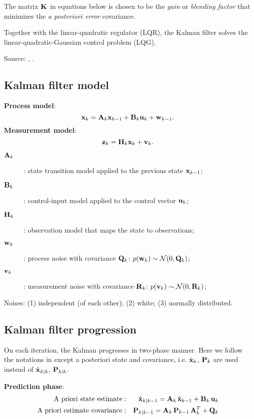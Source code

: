 \documentclass[]{article}
\begin{document}
The matrix ${{\bf K}_{}}$ in equations below is chosen to be the \textit{gain} or \textit{blending factor} that minimizes the \textit{a posteriori error} covariance.

Together with the linear-quadratic regulator (LQR), the Kalman filter solves the linear-quadratic-Gaussian control problem (LQG).

Source: \cite{wiki1}, \cite{Welch06}.
\pagebreak

\subsection{Kalman filter model}

\noindent\textbf{Process model}:
\begin{equation}
{{\bf x}_{k}} = {{\bf A}_{k}}{{\bf x}_{k-1}} + {{\bf B}_{k}}{{\bf u}_{k}} + {{\bf w}_{k-1}}.
\end{equation}
\noindent\textbf{Measurement model}:
\begin{equation}
{{\bf z}_{k}} = {{\bf H}_{k}}{{\bf x}_{k}} + {{\bf v}_{k}}.
\end{equation}
\begin{description}
\item[${{\bf A}_{k}}$]: state transition model applied to the previous state ${{\bf x}_{k-1}}$;
\item[${{\bf B}_{k}}$]: control-input model applied to the control vector ${{\bf u}_{k}}$;
\item[${{\bf H}_{k}}$]: observation model that maps the state to observations;
\item[${{\bf w}_{k}}$]: process noise with covariance ${{\bf Q}_{k}}$: $p({{\bf w}_{k}}) \sim {\cal N}(0, {{\bf Q}_{k}})$;
\item[${{\bf v}_{k}}$]: measurement noise with covariance ${{\bf R}_{k}}$: $p({{\bf v}_{k}}) \sim {\cal N}(0, {{\bf R}_{k}})$;
\end{description}

\noindent Noises: (1) independent (of each other); (2) white; (3) normally distributed.

\subsection{Kalman filter progression}

On each iteration, the Kalman progresses in two-phase manner. Here we follow the notations in \cite{wiki1} except a posteriori state and covariance, i.e. ${{\hat{\bf x}}_{k}}$, ${{\bf P}_{k}}$ are used instead of ${{\hat{\bf x}}_{k|k}}$, ${{\bf P}_{k|k}}$.
\vspace{0.5em}

\noindent\textbf{Prediction phase}:
\begin{eqnarray}
\mbox{A priori state estimate}      &:& {{\hat{\bf x}}_{k|k-1}} = {{\bf A}_{k}}\,{{\hat{\bf x}}_{k-1}} + {{\bf B}_{k}}\,{{\bf u}_{k}} \\
\mbox{A priori estimate covariance} &:& {{\bf P}_{k|k-1}} = {{\bf A}_{k}}\,{{\bf P}_{k-1}}\,{{\bf A}_{k}^T} + {{\bf Q}_{k}}
\end{eqnarray}
\end{document}
